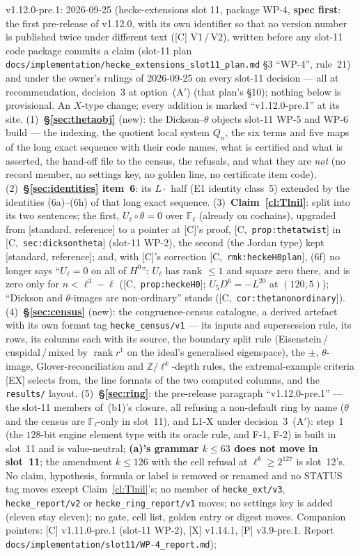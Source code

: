 \documentclass[11pt]{article}
\theoremstyle{remark}
\newcommand{\F}{\mathbb{F}}
\newcommand{\Z}{\mathbb{Z}}
\newcommand{\Fl}{\F_\ell}
\DeclareMathOperator{\rank}{rank}
\newcommand{\HA}[1]{[C,~\texttt{#1}]}      %
\newcommand{\STD}{\textsf{[standard, reference]}}
\begin{document}
v1.12.0-pre.1: 2026-09-25 (hecke-extensions slot 11, package WP-4, \textbf{spec
first}: the first pre-release of v1.12.0, with its own identifier so that no version number is
published twice under different text ([C] V1\,/\,V2), written before any slot-11 code package
commits a claim (slot-11 plan \texttt{docs/implementation/hecke\_extensions\_slot11\_plan.md}
\S3 ``WP-4'', rule~21) and under the owner's rulings of 2026-09-25 on every slot-11 decision ---
all at recommendation, decision~3 at option~(A$'$) (that plan's \S10); nothing below is
provisional. An $X$-type change; every addition is marked ``v1.12.0-pre.1'' at its site.
(1)~\textbf{\S\ref{sec:thetaobj}} (new): the Dickson--$\theta$ objects slot-11 WP-5 and WP-6
build --- the indexing, the quotient local system $Q_n$, the six terms and five maps of the long
exact sequence with their code names, what is certified and what is asserted, the hand-off file
to the census, the refusals, and what they are \emph{not} (no record member, no settings key, no
golden line, no certificate item code). (2)~\textbf{\S\ref{sec:identities} item~6}: its $L\cdot$
half (E1 identity class~5) extended by the identities (6a)--(6h) of that long exact sequence.
(3)~\textbf{Claim~\ref{cl:Tlnil}}: split into its two sentences; the first, $U_\ell\circ\theta=0$
over $\Fl$ (already on cochains), upgraded from \STD{} to a pointer at [C]'s proof,
\HA{prop:thetatwist} in \HA{sec:dicksontheta} (slot-11 WP-2), the second (the Jordan type) kept
\STD; and, with [C]'s correction \HA{rmk:heckeH0plan}, (6f) no longer says ``$U_\ell=0$ on all of
$H^0$'': $U_\ell$ has rank $\le1$ and square zero there, and is zero only for $n<\ell^3-\ell$
(\HA{prop:heckeH0}; $U_5D^6=-L^{20}$ at $(120,5)$); ``Dickson and $\theta$-images are
non-ordinary'' stands (\HA{cor:thetanonordinary}). (4)~\textbf{\S\ref{sec:census}}
(new): the congruence-census catalogue, a derived artefact with its own format tag
\texttt{hecke\_census/v1} --- its inputs and supersession rule, its rows, its columns each with
its source, the boundary split rule (Eisenstein\,/\,cuspidal\,/\,mixed by $\rank r^1$ on the
ideal's generalised eigenspace), the $\pm$, $\theta$-image, Glover-reconciliation and
$\Z/\ell^k$-depth rules, the extremal-example criteria [EX] selects from, the line formats of the
two computed columns, and the \texttt{results/} layout. (5)~\textbf{\S\ref{sec:ring}}: the
pre-release paragraph ``v1.12.0-pre.1'' --- the slot-11 members of~(b1)'s closure, all refusing a
non-default ring by name ($\theta$ and the census are $\Fl$-only in slot~11), and L1-X under
decision~3~(A$'$): step~1 (the $128$-bit engine element type with its oracle rule, and F-1, F-2) is
built in slot~11 and is value-neutral; \textbf{(a)'s grammar $k\le63$ does not move in slot~11};
the amendment $k\le126$ with the cell refusal at $\ell^k\ge2^{127}$ is slot~12's. No claim,
hypothesis, formula or label is removed or renamed and no STATUS tag moves except
Claim~\ref{cl:Tlnil}'s; no member of \texttt{hecke\_ext/v3}, \texttt{hecke\_report/v2} or
\texttt{hecke\_ring\_report/v1} moves; no settings key is added (eleven stay eleven); no gate, cell
list, golden entry or digest moves. Companion pointers: [C] v1.11.0-pre.1 (slot-11 WP-2), [X]
v1.14.1, [P] v3.9-pre.1. Report \texttt{docs/implementation/slot11/WP-4\_report.md});
\end{document}
